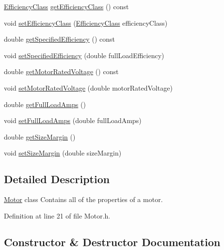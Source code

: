 \begin{DoxyCompactItemize}
\item 
\hyperlink{class_motor_afa022971ae062406a9f588c601673d4e}{Efficiency\+Class} \hyperlink{class_motor_a5d0078bdc164e5ed14334373f183be55}{get\+Efficiency\+Class} () const
\item 
void \hyperlink{class_motor_afa82df266d74ccfed49bf592b5b6526f}{set\+Efficiency\+Class} (\hyperlink{class_motor_afa022971ae062406a9f588c601673d4e}{Efficiency\+Class} efficiency\+Class)
\item 
double \hyperlink{class_motor_aca202d3c2061bd8c19e1819331033e36}{get\+Specified\+Efficiency} () const
\item 
void \hyperlink{class_motor_a0a096ec5fc2b7e8ee40b4e7b30e5f337}{set\+Specified\+Efficiency} (double full\+Load\+Efficiency)
\item 
double \hyperlink{class_motor_a3fedfc960a6970508b39999c58d44cc6}{get\+Motor\+Rated\+Voltage} () const
\item 
void \hyperlink{class_motor_aab754019236e34cba0acd3632567515e}{set\+Motor\+Rated\+Voltage} (double motor\+Rated\+Voltage)
\item 
double \hyperlink{class_motor_a612eb0dabb9623ee8e0866046527d16a}{get\+Full\+Load\+Amps} ()
\item 
void \hyperlink{class_motor_a4bc8bf85c7749a0b7ff279d7eef20a2e}{set\+Full\+Load\+Amps} (double full\+Load\+Amps)
\item 
double \hyperlink{class_motor_aff485f55bed5b58d1454ce5c71bc0729}{get\+Size\+Margin} ()
\item 
void \hyperlink{class_motor_ab39a9375d17af151b6f9516674f37928}{set\+Size\+Margin} (double size\+Margin)
\end{DoxyCompactItemize}


\subsection{Detailed Description}
\hyperlink{class_motor}{Motor} class Contains all of the properties of a motor. 

Definition at line 21 of file Motor.\+h.



\subsection{Constructor \& Destructor Documentation}
\mbox{\label{class_motor_a529cb2685eef1f83ae6a775dd5e50ad9}} 
